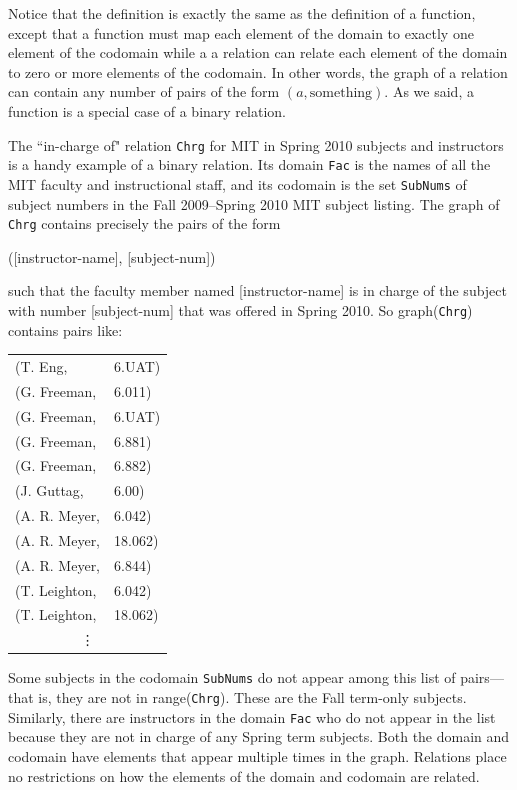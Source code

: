 \documentclass[11pt,oneside]{book}
\theoremstyle{definition}
\begin{document}
Notice that the definition is exactly the same as the definition of a function, except that a function must map each element of the domain to exactly one element of the codomain while a a relation can relate each element of the domain to zero or more elements of the codomain.
In other words, the graph of a relation can contain any number of pairs of the form $(a, \text{something})$.
As we said, a function is a special case of a binary relation.

The ``in-charge of" relation \texttt{Chrg} for MIT in Spring 2010 subjects and instructors is a handy example of a binary relation.
Its domain \texttt{Fac} is the names of all the MIT faculty and instructional staff, and its codomain is the set \texttt{SubNums} of subject numbers in the Fall 2009–Spring 2010 MIT subject listing.
The graph of \texttt{Chrg} contains precisely the pairs of the form
\begin{center} ([instructor-name], [subject-num]) \end{center}
such that the faculty member named [instructor-name] is in charge of the subject
with number [subject-num] that was offered in Spring 2010.
So graph(\texttt{Chrg}) contains pairs like:

\begin{center}\begin{tabular}{ll}
    (T. Eng, & 6.UAT) \\
    (G. Freeman, & 6.011) \\
    (G. Freeman, & 6.UAT) \\
    (G. Freeman, & 6.881) \\
    (G. Freeman, & 6.882) \\
    (J. Guttag, & 6.00) \\
    (A. R. Meyer, & 6.042) \\
    (A. R. Meyer, & 18.062) \\
    (A. R. Meyer, & 6.844) \\
    (T. Leighton, & 6.042) \\
    (T. Leighton, & 18.062) \\
    \multicolumn{2}{c}{\vdots}
\end{tabular}\end{center}

Some subjects in the codomain \texttt{SubNums} do not appear among this list of pairs---that is, they are not in range(\texttt{Chrg}).
These are the Fall term-only subjects.
Similarly, there are instructors in the domain \texttt{Fac} who do not appear in the list because they are not in charge of any Spring term subjects.
Both the domain and codomain have elements that appear multiple times in the graph.
Relations place no restrictions on how the elements of the domain and codomain are related.
\end{document}
